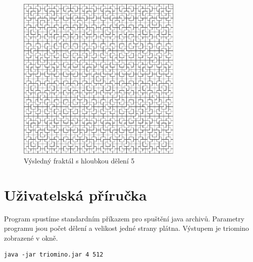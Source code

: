 \documentclass[11pt]{article}
\begin{document}
\begin{figure}[ht!]
\centering
	\includegraphics[width=8cm]{triomino5.png}
	\caption{Výsledný fraktál s hloubkou dělení 5}
\end{figure}


\section{Uživatelská příručka}
Program spustíme standardním příkazem pro spuštění java archivů. Parametry
programu jsou počet dělení a velikost jedné strany plátna. Výstupem je triomino
zobrazené v okně.

\begin{verbatim}
java -jar triomino.jar 4 512
\end{verbatim}
\end{document}
